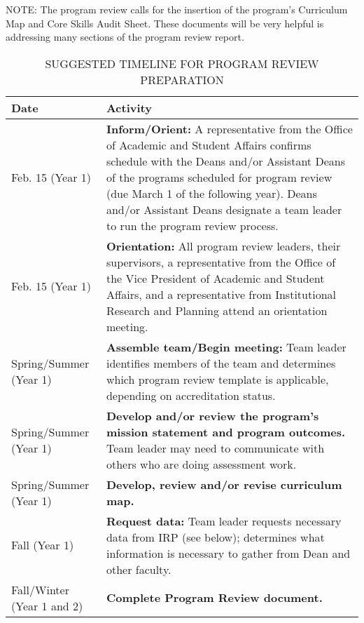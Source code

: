 NOTE: The program review calls for the insertion of the program’s Curriculum Map and Core Skills Audit Sheet. These documents will be very helpful is addressing many sections of the program review report.
\begin{center}
 \begin{longtable}[c]{|p{5cm}|p{10cm}|}
 \caption{SUGGESTED TIMELINE FOR PROGRAM REVIEW PREPARATION }
 \hline
 Date & Activity \\ 
 \hline\hline
Feb. 15 (Year 1) & \textbf{Inform/Orient:} A representative from the Office of Academic and Student Affairs confirms schedule with the Deans and/or Assistant Deans of the programs scheduled for program review (due March 1 of the following year). Deans and/or Assistant Deans designate a team leader to run the program review process.
 \\ 
 \hline
 Feb. 15 (Year 1) & \textbf{Orientation:} All program review leaders, their supervisors, a representative from the Office of the Vice President of Academic and Student Affairs, and a representative from Institutional Research and Planning attend an orientation meeting.
 \\
 \hline
Spring/Summer (Year 1) & \textbf{Assemble team/Begin meeting:} Team leader identifies members of the team and determines which program review template is applicable, depending on accreditation status.
\\
 \hline
 Spring/Summer (Year 1) & \textbf{Develop and/or review the program’s mission statement and program outcomes.} Team leader may need to communicate with others who are doing assessment work.\\
 \hline
 Spring/Summer (Year 1) & \textbf{Develop, review and/or revise curriculum map.} \\
 \hline
 Fall (Year 1) & \textbf{Request data:} Team leader requests necessary data from IRP (see below); determines what information is necessary to gather from Dean and other faculty. \\ [1ex] 
 \hline
 
 Fall/Winter (Year 1 and 2) & \textbf{Complete Program Review document.}
 \\ 
 \hline


\end{longtable}
\end{center}
